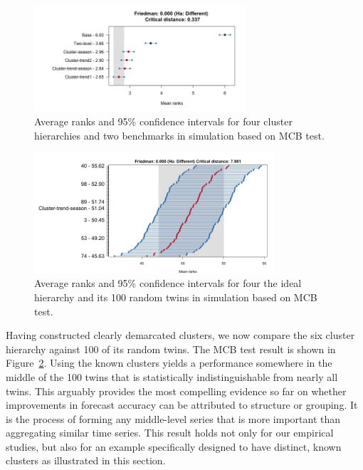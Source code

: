 \documentclass[a4paper,review,12pt,authoryear]{elsarticle}
\begin{document}
\begin{figure}[!h]
    \centering
    \vspace{0.1in}\includegraphics[width=0.7\textwidth]{../figures/Figure10.jpg}
   \vspace{-0.1in}
\caption{\label{fig:simu_P3_benchmarks}Average ranks and 95\% confidence intervals for four cluster hierarchies and two benchmarks in simulation based on MCB test.}
\end{figure}

\begin{figure}[!h]
    \centering
\includegraphics[width=0.8\textwidth]{../figures/Figure11.jpg}
    \vspace{-0.1in}
    \caption{Average ranks and 95\% confidence intervals for four the ideal hierarchy and its 100 random twins in simulation based on MCB test.}
    \label{fig:simu_P3_c_vs_pc}
\end{figure}


Having constructed clearly demarcated clusters, we now compare the six cluster hierarchy against 100 of its random twins.  The MCB test result is shown in Figure~\ref{fig:simu_P3_c_vs_pc}. Using the known clusters yields a performance somewhere in the middle of the 100 twins that is statistically indistinguishable from nearly all twins. %
This arguably provides the most compelling evidence so far on whether improvements in forecast accuracy can be attributed to structure or grouping. It is the process of forming any middle-level series that is more important than aggregating similar time series. This result holds not only for our empirical studies, but also for an example specifically designed to have distinct, known clusters as illustrated in this section.
\end{document}
